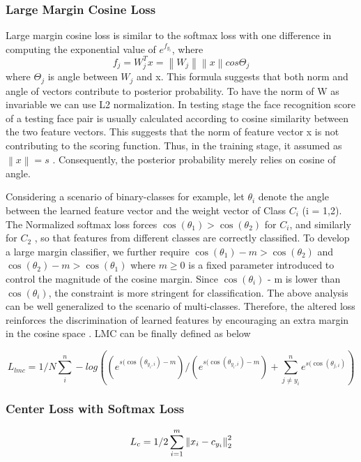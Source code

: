 \documentclass[a4paper,12pt, twoside]{NITKReport}
\begin{document}
\subsubsection{Large Margin Cosine Loss}
Large margin cosine loss is similar to the softmax loss with one difference in computing the exponential value of $e^{f_{y_{i}}}$, where 
\begin{equation}
{f_{j}}=W_{j}^{T} x = \left \| W_{j} \right \|\left \| x \right \|cos\Theta _{j}
\end{equation}
where $\Theta _{j}$ is angle between $W_{j}$ and x. This formula suggests that both norm and angle of vectors contribute to posterior probability. To have the norm of W as invariable we can use L2 normalization. In testing stage the face recognition score of a testing face pair is usually calculated according to cosine similarity between the two feature vectors.  This suggests that the norm of feature vector x is not  contributing to the scoring function.  Thus, in the training stage, it assumed as $\left \| x \right \| =s$ . Consequently, the posterior probability merely relies on cosine of angle.

Considering  a  scenario  of  binary-classes  for  example, let $\theta _{i}$ denote the angle between the learned feature vector and  the  weight  vector  of  Class $C_{i}$ (i = 1,2). The Normalized softmax loss forces $\cos(\theta_{1}) > \cos(\theta_{2})$ for $C_{i}$, and similarly  for $C_{2}$ , so that features from different classes are correctly classified. To develop a large margin classifier, we further require $\cos(\theta_{1}) - m > \cos(\theta_{2})$ and $\cos(\theta_{2}) - m > \cos(\theta_{1})$ where $m \geq 0$  is a fixed parameter introduced to control the magnitude of the cosine margin. Since $\cos(\theta_{i})$ - m is lower than $\cos(\theta_{i})$, the constraint is more stringent for classification. The above analysis can be well generalized to the scenario of multi-classes.  Therefore, the altered loss reinforces the
discrimination of learned features by encouraging an extra margin in the cosine space \cite{DBLP:journals/corr/abs-1801-09414}. LMC can be finally defined as below

\begin{equation}
L_{lmc} = 1/N\sum_{i}^{n} -log((e^{s(\cos(\theta_{y_{i},i})-m})/
(e^{s(\cos(\theta_{y_{i},i})-m})+\sum_{j\neq y_{i}}^{n} e^{s(\cos(\theta_{j,i})})
\end{equation}


\subsubsection{Center Loss with Softmax Loss}
\begin{equation}
\centering
L_{c} = 1/2 \sum_{i=1}^{m}\left \| x{_{i}} - c_{y_{i}} \right \|_{2}^{2}
\end{equation}
\end{document}
